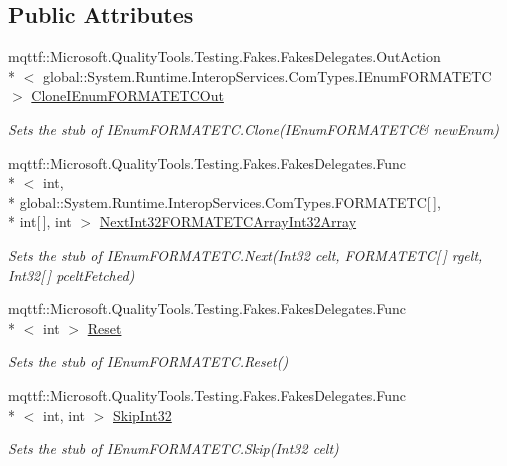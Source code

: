 \subsection*{Public Attributes}
\begin{DoxyCompactItemize}
\item 
mqttf\-::\-Microsoft.\-Quality\-Tools.\-Testing.\-Fakes.\-Fakes\-Delegates.\-Out\-Action\\*
$<$ global\-::\-System.\-Runtime.\-Interop\-Services.\-Com\-Types.\-I\-Enum\-F\-O\-R\-M\-A\-T\-E\-T\-C $>$ \hyperlink{class_system_1_1_runtime_1_1_interop_services_1_1_com_types_1_1_fakes_1_1_stub_i_enum_f_o_r_m_a_t_e_t_c_a36c57d4bc0a7859fab7653fe908e8574}{Clone\-I\-Enum\-F\-O\-R\-M\-A\-T\-E\-T\-C\-Out}
\begin{DoxyCompactList}\small\item\em Sets the stub of I\-Enum\-F\-O\-R\-M\-A\-T\-E\-T\-C.\-Clone(I\-Enum\-F\-O\-R\-M\-A\-T\-E\-T\-C\& new\-Enum)\end{DoxyCompactList}\item 
mqttf\-::\-Microsoft.\-Quality\-Tools.\-Testing.\-Fakes.\-Fakes\-Delegates.\-Func\\*
$<$ int, \\*
global\-::\-System.\-Runtime.\-Interop\-Services.\-Com\-Types.\-F\-O\-R\-M\-A\-T\-E\-T\-C\mbox{[}$\,$\mbox{]}, \\*
int\mbox{[}$\,$\mbox{]}, int $>$ \hyperlink{class_system_1_1_runtime_1_1_interop_services_1_1_com_types_1_1_fakes_1_1_stub_i_enum_f_o_r_m_a_t_e_t_c_abf8aa0931a60db529b29af6e26653209}{Next\-Int32\-F\-O\-R\-M\-A\-T\-E\-T\-C\-Array\-Int32\-Array}
\begin{DoxyCompactList}\small\item\em Sets the stub of I\-Enum\-F\-O\-R\-M\-A\-T\-E\-T\-C.\-Next(\-Int32 celt, F\-O\-R\-M\-A\-T\-E\-T\-C\mbox{[}$\,$\mbox{]} rgelt, Int32\mbox{[}$\,$\mbox{]} pcelt\-Fetched)\end{DoxyCompactList}\item 
mqttf\-::\-Microsoft.\-Quality\-Tools.\-Testing.\-Fakes.\-Fakes\-Delegates.\-Func\\*
$<$ int $>$ \hyperlink{class_system_1_1_runtime_1_1_interop_services_1_1_com_types_1_1_fakes_1_1_stub_i_enum_f_o_r_m_a_t_e_t_c_aa8b243f50919c955bf41e23c4b2076ce}{Reset}
\begin{DoxyCompactList}\small\item\em Sets the stub of I\-Enum\-F\-O\-R\-M\-A\-T\-E\-T\-C.\-Reset()\end{DoxyCompactList}\item 
mqttf\-::\-Microsoft.\-Quality\-Tools.\-Testing.\-Fakes.\-Fakes\-Delegates.\-Func\\*
$<$ int, int $>$ \hyperlink{class_system_1_1_runtime_1_1_interop_services_1_1_com_types_1_1_fakes_1_1_stub_i_enum_f_o_r_m_a_t_e_t_c_ad1d1ae2c0d0073151436725e3d0f33e8}{Skip\-Int32}
\begin{DoxyCompactList}\small\item\em Sets the stub of I\-Enum\-F\-O\-R\-M\-A\-T\-E\-T\-C.\-Skip(\-Int32 celt)\end{DoxyCompactList}\end{DoxyCompactItemize}


